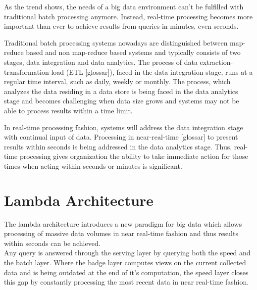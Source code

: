 As the trend shows, the needs of a big data environment can't be fulfilled with 
traditional batch processing anymore. Instead, real-time processing becomes more 
important than ever to achieve results from queries in minutes, even seconds. 
\cite{bange2013big}


Traditional batch processing systems nowadays are distinguished between
map-reduce based and non map-reduce based systems and typically consists of two
stages, data integration and data analytics. The process of data
extraction-transformation-load (ETL  [glossar]), faced in the data integration
stage, runs at a regular time interval, such as daily, weekly or monthly. The
process, which analyzes the data residing in a data store is being faced in the
data analytics stage and becomes challenging when data size grows and systems
may not be able to process results within a time limit.
\cite{Liu:2014:SRP:2628194.2628251}

In real-time processing fashion, systems will address the data integration stage
with continual input of data. Processing in near-real-time [glossar] to present 
results within seconds is being addressed in the data analytics stage. Thus,
real-time processing gives organization the ability to take immediate action
for those times when acting within seconds or minutes is significant.
\cite{PrpSvyOfDSPS}



\section{Lambda Architecture}
The lambda architecture introduces a new paradigm for big data which allows
processing of massive data volumes in near real-time fashion and thus results within
seconds can be achieved. 
\\
Any query is answered through the serving layer by querying 
both the speed and the batch layer. Where the badge layer computes views on the current collected data and
is being outdated at the end of it's computation, the speed layer closes this 
gap by constantly processing the most recent data in near real-time fashion. 
\cite{marz2015big} \cite{PrpSvyOfDSPS}

